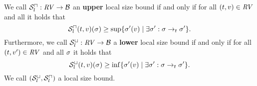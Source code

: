\begin{definition}
  We call ${\mathcal{S}^\sqcap_l}: \mathit{RV} \rightarrow \mathcal{B}$ an \textbf{upper} local size bound if and only if for all $(t, v) \in \mathit{RV}$ and all  it holds that
  \[ {\mathcal{S}^\sqcap_l}(t, v)(\sigma) \geq \sup \lbrace \sigma'(v) \mid \exists \sigma': \sigma \rightarrow_t \sigma' \rbrace. \]
  Furthermore, we call ${\mathcal{S}^\sqcup_l}: \mathit{RV} \rightarrow \mathcal{B}$ a \textbf{lower} local size bound if and only if for all $(t, v') \in \mathit{RV}$ and all $\sigma$ it holds that
  \[ {\mathcal{S}^\sqcup_l}(t, v)(\sigma) \geq \inf \lbrace \sigma'(v) \mid \exists \sigma': \sigma \rightarrow_t \sigma' \rbrace. \]
  We call ${({\mathcal{S}^\sqcup_l}, {\mathcal{S}^\sqcap_l})}$ a local size bound.
\end{definition}
